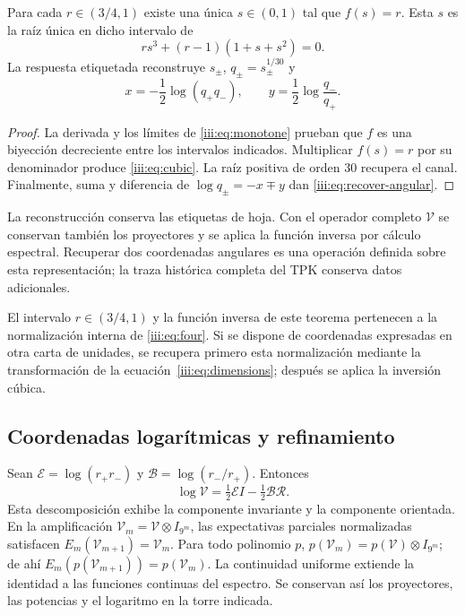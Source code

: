 \begin{theorem}
Para cada $r\in(3/4,1)$ existe una única $s\in(0,1)$ tal que $f(s)=r$.
Esta $s$ es la raíz única en dicho intervalo de
\begin{equation}
 r s^3+(r-1)(1+s+s^2)=0.
 \label{iii:eq:cubic}
\end{equation}
La respuesta etiquetada reconstruye $s_\pm$, $q_\pm=s_\pm^{1/30}$ y
\begin{equation}
 x=-\frac12\log(q_+q_-),\qquad
 y=\frac12\log\frac{q_-}{q_+}.
 \label{iii:eq:recover-angular}
\end{equation}
\end{theorem}
\begin{proof}
La derivada y los límites de \eqref{iii:eq:monotone} prueban que $f$ es una
biyección decreciente entre los intervalos indicados. Multiplicar $f(s)=r$
por su denominador produce \eqref{iii:eq:cubic}. La raíz positiva de orden
$30$ recupera el canal. Finalmente, suma y diferencia de
$\log q_\pm=-x\mp y$ dan \eqref{iii:eq:recover-angular}.
\end{proof}

La reconstrucción conserva las etiquetas de hoja. Con el operador completo
$\mathcal V$ se conservan también los proyectores y se aplica la función
inversa por cálculo espectral. Recuperar dos coordenadas angulares es una
operación definida sobre esta representación; la traza histórica completa
del TPK conserva datos adicionales.

El intervalo $r\in(3/4,1)$ y la función inversa de este teorema pertenecen
a la normalización interna de \eqref{iii:eq:four}. Si se dispone de
coordenadas expresadas en otra carta de unidades, se recupera primero
esta normalización mediante la transformación de la
ecuación~\eqref{iii:eq:dimensions}; después se aplica la inversión cúbica.

\subsection{Coordenadas logarítmicas y refinamiento}

Sean $\mathcal E=\log(r_+r_-)$ y $\mathcal B=\log(r_-/r_+)$. Entonces
\begin{equation}
 \log\mathcal V=\tfrac12\mathcal E I-\tfrac12\mathcal B\mathcal R.
 \label{iii:eq:logvac}
\end{equation}
Esta descomposición exhibe la componente invariante y la componente orientada.
En la amplificación $\mathcal V_m=\mathcal V\otimes I_{9^m}$, las
expectativas parciales normalizadas satisfacen
$E_m(\mathcal V_{m+1})=\mathcal V_m$. Para todo polinomio $p$,
$p(\mathcal V_m)=p(\mathcal V)\otimes I_{9^m}$; de ahí
$E_m(p(\mathcal V_{m+1}))=p(\mathcal V_m)$. La continuidad uniforme
extiende la identidad a las funciones continuas del espectro. Se conservan
así los proyectores, las potencias y el logaritmo en la torre indicada.

